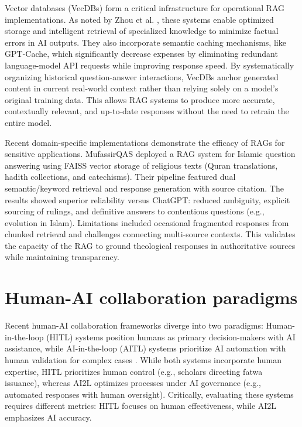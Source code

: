 Vector databases (VecDBs) form a critical infrastructure for operational RAG implementations. As noted by Zhou et al. \cite{jing2025large}, these systems enable optimized storage and intelligent retrieval of specialized knowledge to minimize factual errors in AI outputs. They also incorporate semantic caching mechanisms, like GPT-Cache, which significantly decrease expenses by eliminating redundant language-model API requests while improving response speed. By systematically organizing historical question-answer interactions, VecDBs anchor generated content in current real-world context rather than relying solely on a model's original training data. This allows RAG systems to produce more accurate, contextually relevant, and up-to-date responses without the need to retrain the entire model.

Recent domain-specific implementations demonstrate the efficacy of RAGs for sensitive applications. MufassirQAS \cite{yusuf2024rag} deployed a RAG system for Islamic question answering using FAISS vector storage of religious texts (Quran translations, hadith collections, and catechisms). Their pipeline featured dual semantic/keyword retrieval and response generation with source citation. The results showed superior reliability versus ChatGPT: reduced ambiguity, explicit sourcing of rulings, and definitive answers to contentious questions (e.g., evolution in Islam). Limitations included occasional fragmented responses from chunked retrieval and challenges connecting multi-source contexts. This validates the capacity of the RAG to ground theological responses in authoritative sources while maintaining transparency.
\section{Human-AI collaboration paradigms}

Recent human-AI collaboration frameworks diverge into two paradigms: Human-in-the-loop (HITL) systems position humans as primary decision-makers with AI assistance, while AI-in-the-loop (AITL) systems prioritize AI automation with human validation for complex cases \cite{natarajan2025human}. While both systems incorporate human expertise, HITL prioritizes human control (e.g., scholars directing fatwa issuance), whereas AI2L optimizes processes under AI governance (e.g., automated responses with human oversight). Critically, evaluating these systems requires different metrics: HITL focuses on human effectiveness, while AI2L emphasizes AI accuracy.

